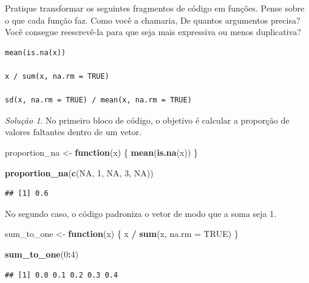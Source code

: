 \documentclass[
]{latex/krantz}
\newenvironment{Shaded}{\begin{snugshade}}{\end{snugshade}}
\newcommand{\AttributeTok}[1]{\textcolor[rgb]{0.13,0.29,0.53}{#1}}
\newcommand{\ConstantTok}[1]{\textcolor[rgb]{0.56,0.35,0.01}{#1}}
\newcommand{\ControlFlowTok}[1]{\textcolor[rgb]{0.13,0.29,0.53}{\textbf{#1}}}
\newcommand{\DecValTok}[1]{\textcolor[rgb]{0.00,0.00,0.81}{#1}}
\newcommand{\FunctionTok}[1]{\textcolor[rgb]{0.13,0.29,0.53}{\textbf{#1}}}
\newcommand{\NormalTok}[1]{#1}
\newcommand{\OtherTok}[1]{\textcolor[rgb]{0.56,0.35,0.01}{#1}}
\newcommand{\SpecialCharTok}[1]{\textcolor[rgb]{0.81,0.36,0.00}{\textbf{#1}}}
\theoremstyle{definition}
\theoremstyle{definition}
\theoremstyle{definition}
\theoremstyle{definition}
\theoremstyle{remark}
\newtheorem*{solution}{Solução}
\begin{document}
Pratique transformar os seguintes fragmentos de código em funções. Pense sobre o que cada função faz. Como você a chamaria, De quantos argumentos precisa? Você consegue reescrevê-la para que seja mais expressiva ou menos duplicativa?

\begin{verbatim}
mean(is.na(x))

x / sum(x, na.rm = TRUE)

sd(x, na.rm = TRUE) / mean(x, na.rm = TRUE)
\end{verbatim}

\begin{solution}

No primeiro bloco de código, o objetivo é calcular a proporção de valores faltantes dentro de um vetor.

\begin{Shaded}
\begin{Highlighting}[]
\NormalTok{proportion\_na }\OtherTok{\textless{}{-}} \ControlFlowTok{function}\NormalTok{(x) \{}
  \FunctionTok{mean}\NormalTok{(}\FunctionTok{is.na}\NormalTok{(x))}
\NormalTok{\}}

\FunctionTok{proportion\_na}\NormalTok{(}\FunctionTok{c}\NormalTok{(}\ConstantTok{NA}\NormalTok{, }\DecValTok{1}\NormalTok{, }\ConstantTok{NA}\NormalTok{, }\DecValTok{3}\NormalTok{, }\ConstantTok{NA}\NormalTok{))}
\end{Highlighting}
\end{Shaded}

\begin{verbatim}
## [1] 0.6
\end{verbatim}

No segundo caso, o código padroniza o vetor de modo que a soma seja 1.

\begin{Shaded}
\begin{Highlighting}[]
\NormalTok{sum\_to\_one }\OtherTok{\textless{}{-}} \ControlFlowTok{function}\NormalTok{(x) \{}
\NormalTok{  x }\SpecialCharTok{/} \FunctionTok{sum}\NormalTok{(x, }\AttributeTok{na.rm =} \ConstantTok{TRUE}\NormalTok{)}
\NormalTok{\}}

\FunctionTok{sum\_to\_one}\NormalTok{(}\DecValTok{0}\SpecialCharTok{:}\DecValTok{4}\NormalTok{)}
\end{Highlighting}
\end{Shaded}

\begin{verbatim}
## [1] 0.0 0.1 0.2 0.3 0.4
\end{verbatim}


\end{solution}
\end{document}
